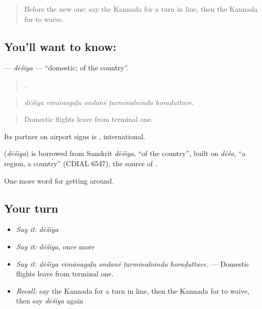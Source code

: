 \label{lesson:KA-C441-desiya}



\begin{quote}
Before the new one: say the Kannada for a turn in line, then the Kannada for to waive.
\end{quote}

\subsection*{You'll want to know: }
\textbf{} — \emph{dēśīya} — \textquotedblleft{}domestic; of the country\textquotedblright{}.

\begin{quote}
    .
\end{quote}

\begin{quote}
\emph{dēśīya vimānagaḷu ondanē ṭarminalninda horaḍuttave.}
\end{quote}

\begin{quote}
Domestic flights leave from terminal one.
\end{quote}

Its partner on airport signs is , international.

\begin{cousinweb}
\textbf{} (\emph{dēśīya}) is borrowed from Sanskrit \emph{dēśīya}, \textquotedblleft{}of the country\textquotedblright{}, built on \emph{dēśa}, \textquotedblleft{}a region, a country\textquotedblright{} (CDIAL 6547), the source of .
\end{cousinweb}

\begin{grammarlens}[title={What you've built}]
One more word for getting around.
\end{grammarlens}

\subsection*{Your turn}
\begin{itemize}
\raggedright
  \item \emph{Say it:} \emph{dēśīya}
  \item \emph{Say it:} \emph{dēśīya}, once more
  \item \emph{Say it:} \emph{dēśīya vimānagaḷu ondanē ṭarminalninda horaḍuttave.} — Domestic flights leave from terminal one.
  \item \emph{Recall:} say the Kannada for a turn in line, then the Kannada for to waive, then say \emph{dēśīya} again
\end{itemize}

